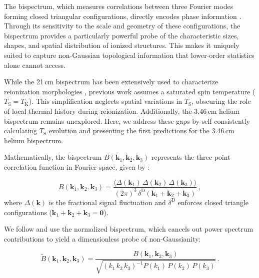 \documentclass[apj,twocolumn, appendixfloats, twocolappendix, numberedappendix, tighten]{openjournal}
\begin{document}
The bispectrum, which measures correlations between three Fourier modes forming closed triangular configurations, directly encodes phase information \citep[e.g.,][]{Lewis2011, Hutter2020a}. Through its sensitivity to the scale and geometry of these configurations, the bispectrum provides a particularly powerful probe of the characteristic sizes, shapes, and spatial distribution of ionized structures. This makes it uniquely suited to capture non-Gaussian topological information that lower-order statistics alone cannot access.

While the 21\,cm bispectrum has been extensively used to characterize reionization morphologies \citep[e.g.,][]{Majumdar2018, Hutter2020a, Acharya2024}, previous work assumes a saturated spin temperature ($T_\mathrm{S} = T_\mathrm{K}$). This simplification neglects spatial variations in $T_\mathrm{S}$, obscuring the role of local thermal history during reionization. Additionally, the 3.46\,cm helium bispectrum remains unexplored. Here, we address these gaps by self-consistently calculating $T_\mathrm{S}$ evolution and presenting the first predictions for the 3.46\,cm helium bispectrum.


Mathematically, the bispectrum $B(\mathbf{k}_1, \mathbf{k}_2, \mathbf{k}_3)$ represents the three-point correlation function in Fourier space, given by \citep[][]{Watkinson2017}:

\begin{equation}
    B(\mathbf{k}_1, \mathbf{k}_2, \mathbf{k}_3) = \frac{\langle \Delta(\mathbf{k}_1) \,\Delta(\mathbf{k}_2)\,\Delta(\mathbf{k}_3) \rangle}{(2\pi)^3 \,\delta^\mathrm{D}(\mathbf{k}_1 + \mathbf{k}_2 + \mathbf{k}_3)} \, ,
\end{equation}
where $\Delta(\mathbf{k})$ is the fractional signal fluctuation and $\delta^\mathrm{D}$ enforces closed triangle configurations ($\mathbf{k}_1 + \mathbf{k}_2 + \mathbf{k}_3 = \mathbf{0}$).

We follow \citet{Watkinson2017} and use the normalized bispectrum, which cancels out power spectrum contributions to yield a dimensionless probe of non-Gaussianity:

\begin{equation}
    \tilde{B}(\mathbf{k}_1, \mathbf{k}_2, \mathbf{k}_3) = \frac{B(\mathbf{k}_1, \mathbf{k}_2, \mathbf{k}_3)}{\sqrt{(k_1 \, k_2 \, k_3)^{-1} P(k_1) \, P(k_2) \, P(k_3)}} \, .
\end{equation}



\end{document}
